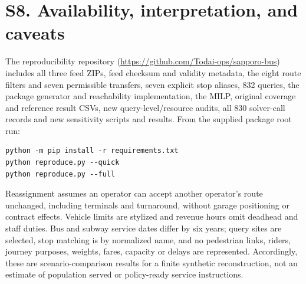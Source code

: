 \documentclass[10pt]{article}
\begin{document}
\section*{S8. Availability, interpretation, and caveats}
The reproducibility repository (\url{https://github.com/Todai-ops/sapporo-bus}) includes all three feed ZIPs, feed checksum and validity metadata, the eight route filters and seven permissible transfers, seven explicit stop aliases, 832 queries, the package generator and reachability implementation, the MILP, original coverage and reference result CSVs, new query-level/resource audits, all 830 solver-call records and new sensitivity scripts and results. From the supplied package root run:
\begin{verbatim}
python -m pip install -r requirements.txt
python reproduce.py --quick
python reproduce.py --full
\end{verbatim}
Reassignment assumes an operator can accept another operator's route unchanged, including terminals and turnaround, without garage positioning or contract effects. Vehicle limits are stylized and revenue hours omit deadhead and staff duties. Bus and subway service dates differ by six years; query sites are selected, stop matching is by normalized name, and no pedestrian links, riders, journey purposes, weights, fares, capacity or delays are represented. Accordingly, these are scenario-comparison results for a finite synthetic reconstruction, not an estimate of population served or policy-ready service instructions.
\end{document}
